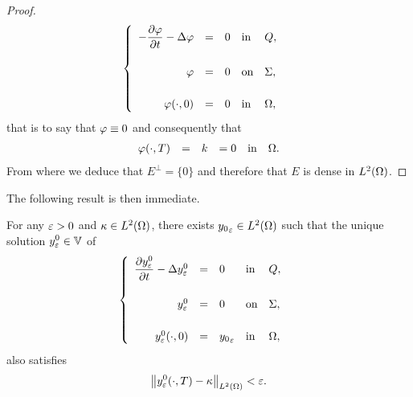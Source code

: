 \begin{proof}
\begin{equation*}
        \begin{cases}\displaystyle
            \begin{array}{rclll}
                -\dfrac{\partial{}\varphi}{\partial{}t} - \Delta\varphi & = & 0 & \text{in} &
                Q,\\
                \\
                \varphi & = & 0 & \text{on} & \Sigma,\\
                \\
                \varphi\!\left({\cdot,0}\right) & = & 0 & \text{in} &
                \Omega,
            \end{array}
        \end{cases}
    \end{equation*}
    that is to say that $\varphi\equiv 0$ and consequently that
    \begin{equation*}
        \begin{array}{rclcll}
            \varphi\!\left({\cdot,T}\right) & = & k & = 0 & \text{in} &
            \Omega.
        \end{array}
    \end{equation*}
    From where we deduce that $E^{\perp} = \{0\}$ and therefore that $E$ is
    dense in $L^{2}\!\left({\Omega}\right)$.
\end{proof}

The following result is then immediate.

\begin{corollaire}\label{coro:controllability-result-2}%
    For any $\varepsilon > 0$ and $\kappa\in L^{2}\!\left({\Omega}\right)$, there exists
    ${y_{0}}_{\varepsilon}\in L^{2}\!\left({\Omega}\right)$ such that the unique solution
    $\displaystyle y_{\varepsilon}^{0}\in \mathbb{V}$ of
    \begin{equation}\label{eq:controllability-result-3}
        \begin{cases}\displaystyle
            \begin{array}{rclll}
                \dfrac{\partial{}y_{\varepsilon}^{0}}{\partial{}t} - \Delta y_{\varepsilon}^{0} & = & 0 &
                \text{in} & Q,\\
                \\
                y_{\varepsilon}^{0} & = & 0 & \text{on} & \Sigma,\\
                \\
                y_{\varepsilon}^{0}\!\left({\cdot,0}\right) & = & {y_{0}}_{\varepsilon}
                & \text{in} & \Omega,
            \end{array}
        \end{cases}
    \end{equation}
    also satisfies
    \begin{equation}\label{eq:controllability-result-4}
        {\left\|{y_{\varepsilon}^{0}\!\left({\cdot,T}\right) - \kappa }\right\|}_{L^{2}\left({\Omega}\right)} < \varepsilon.
    \end{equation}
\end{corollaire}

